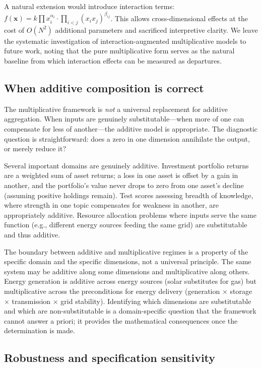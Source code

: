 \documentclass[12pt, a4paper]{article}
\theoremstyle{definition}
\theoremstyle{remark}
\begin{document}
A natural extension would introduce interaction terms: $f(\mathbf{x}) = k \prod x_i^{\alpha_i} \cdot \prod_{i < j} (x_i x_j)^{\beta_{ij}}$. This allows cross-dimensional effects at the cost of $O(N^2)$ additional parameters and sacrificed interpretive clarity. We leave the systematic investigation of interaction-augmented multiplicative models to future work, noting that the pure multiplicative form serves as the natural baseline from which interaction effects can be measured as departures.

\subsection{When additive composition is correct}\label{sec:whenadd}

The multiplicative framework is \textit{not} a universal replacement for additive aggregation. When inputs are genuinely substitutable---when more of one can compensate for less of another---the additive model is appropriate. The diagnostic question is straightforward: does a zero in one dimension annihilate the output, or merely reduce it?

Several important domains are genuinely additive. Investment portfolio returns are a weighted sum of asset returns; a loss in one asset is offset by a gain in another, and the portfolio's value never drops to zero from one asset's decline (assuming positive holdings remain). Test scores assessing breadth of knowledge, where strength in one topic compensates for weakness in another, are appropriately additive. Resource allocation problems where inputs serve the same function (e.g., different energy sources feeding the same grid) are substitutable and thus additive.

The boundary between additive and multiplicative regimes is a property of the specific domain and the specific dimensions, not a universal principle. The same system may be additive along some dimensions and multiplicative along others. Energy generation is additive across energy sources (solar substitutes for gas) but multiplicative across the preconditions for energy delivery (generation $\times$ storage $\times$ transmission $\times$ grid stability). Identifying which dimensions are substitutable and which are non-substitutable is a domain-specific question that the framework cannot answer a priori; it provides the mathematical consequences once the determination is made.

\subsection{Robustness and specification sensitivity}
\end{document}
